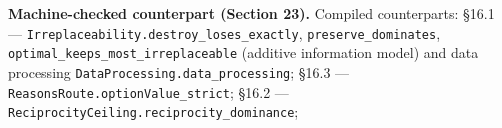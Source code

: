 \documentclass[
]{article}
\begin{document}
\textbf{Machine-checked counterpart (Section 23).} Compiled
counterparts: §16.1 ---
\texttt{I\allowbreak{}r\allowbreak{}r\allowbreak{}e\allowbreak{}p\allowbreak{}l\allowbreak{}a\allowbreak{}c\allowbreak{}e\allowbreak{}a\allowbreak{}b\allowbreak{}i\allowbreak{}l\allowbreak{}i\allowbreak{}t\allowbreak{}y\allowbreak{}.\allowbreak{}d\allowbreak{}e\allowbreak{}s\allowbreak{}t\allowbreak{}r\allowbreak{}o\allowbreak{}y\allowbreak{}\_\allowbreak{}l\allowbreak{}o\allowbreak{}s\allowbreak{}e\allowbreak{}s\allowbreak{}\_\allowbreak{}e\allowbreak{}x\allowbreak{}a\allowbreak{}c\allowbreak{}t\allowbreak{}l\allowbreak{}y},
\texttt{p\allowbreak{}r\allowbreak{}e\allowbreak{}s\allowbreak{}e\allowbreak{}r\allowbreak{}v\allowbreak{}e\allowbreak{}\_\allowbreak{}d\allowbreak{}o\allowbreak{}m\allowbreak{}i\allowbreak{}n\allowbreak{}a\allowbreak{}t\allowbreak{}e\allowbreak{}s},
\texttt{o\allowbreak{}p\allowbreak{}t\allowbreak{}i\allowbreak{}m\allowbreak{}a\allowbreak{}l\allowbreak{}\_\allowbreak{}k\allowbreak{}e\allowbreak{}e\allowbreak{}p\allowbreak{}s\allowbreak{}\_\allowbreak{}m\allowbreak{}o\allowbreak{}s\allowbreak{}t\allowbreak{}\_\allowbreak{}i\allowbreak{}r\allowbreak{}r\allowbreak{}e\allowbreak{}p\allowbreak{}l\allowbreak{}a\allowbreak{}c\allowbreak{}e\allowbreak{}a\allowbreak{}b\allowbreak{}l\allowbreak{}e}
(additive information model) and data processing
\texttt{D\allowbreak{}a\allowbreak{}t\allowbreak{}a\allowbreak{}P\allowbreak{}r\allowbreak{}o\allowbreak{}c\allowbreak{}e\allowbreak{}s\allowbreak{}s\allowbreak{}i\allowbreak{}n\allowbreak{}g\allowbreak{}.\allowbreak{}d\allowbreak{}a\allowbreak{}t\allowbreak{}a\allowbreak{}\_\allowbreak{}p\allowbreak{}r\allowbreak{}o\allowbreak{}c\allowbreak{}e\allowbreak{}s\allowbreak{}s\allowbreak{}i\allowbreak{}n\allowbreak{}g};
§16.3 ---
\texttt{R\allowbreak{}e\allowbreak{}a\allowbreak{}s\allowbreak{}o\allowbreak{}n\allowbreak{}s\allowbreak{}R\allowbreak{}o\allowbreak{}u\allowbreak{}t\allowbreak{}e\allowbreak{}.\allowbreak{}o\allowbreak{}p\allowbreak{}t\allowbreak{}i\allowbreak{}o\allowbreak{}n\allowbreak{}V\allowbreak{}a\allowbreak{}l\allowbreak{}u\allowbreak{}e\allowbreak{}\_\allowbreak{}s\allowbreak{}t\allowbreak{}r\allowbreak{}i\allowbreak{}c\allowbreak{}t};
§16.2 ---
\texttt{R\allowbreak{}e\allowbreak{}c\allowbreak{}i\allowbreak{}p\allowbreak{}r\allowbreak{}o\allowbreak{}c\allowbreak{}i\allowbreak{}t\allowbreak{}y\allowbreak{}C\allowbreak{}e\allowbreak{}i\allowbreak{}l\allowbreak{}i\allowbreak{}n\allowbreak{}g\allowbreak{}.\allowbreak{}r\allowbreak{}e\allowbreak{}c\allowbreak{}i\allowbreak{}p\allowbreak{}r\allowbreak{}o\allowbreak{}c\allowbreak{}i\allowbreak{}t\allowbreak{}y\allowbreak{}\_\allowbreak{}d\allowbreak{}o\allowbreak{}m\allowbreak{}i\allowbreak{}n\allowbreak{}a\allowbreak{}n\allowbreak{}c\allowbreak{}e};
\end{document}
